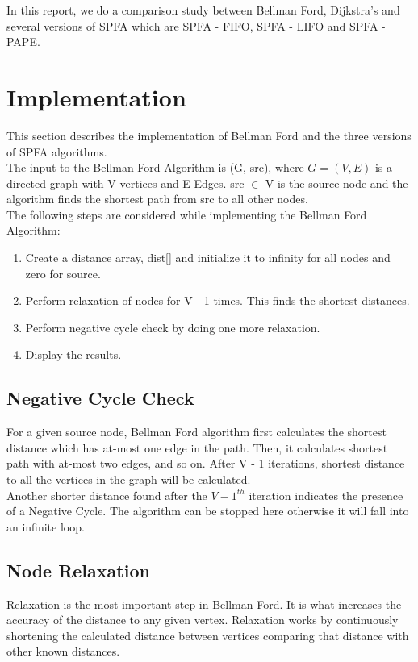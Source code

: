 \documentclass[12pt]{article}
\begin{document}
In this report, we do a comparison study between Bellman Ford, Dijkstra's and several versions of SPFA which are SPFA - FIFO, SPFA - LIFO and SPFA - PAPE. \\

\section{Implementation}
\label{sec:impl}
This section describes the implementation of Bellman Ford and the three versions of SPFA algorithms. \\

The input to the Bellman Ford Algorithm is (G, src), where $G = (V, E)$ is a directed graph with V vertices and E Edges. src $\in$ V is the source node and the algorithm finds the shortest path from src to all other nodes. \\  

The following steps are considered while implementing the Bellman Ford Algorithm:
\begin{enumerate}
	\item Create a distance array, dist[] and initialize it to infinity for all nodes and zero for source. 
	
	\item Perform relaxation of nodes for V - 1 times. This finds the shortest distances. 
	
	\item Perform negative cycle check by doing one more relaxation. 
	
	\item Display the results.  
\end{enumerate}

\subsection{Negative Cycle Check}
For a given source node, Bellman Ford algorithm first calculates the shortest distance which has at-most one edge in the path. Then, it calculates shortest path with at-most two edges, and so on. After V - 1 iterations, shortest distance to all the vertices in the graph will be calculated. \\ 
Another shorter distance found after the $V - 1^{th}$ iteration indicates the presence of a Negative Cycle. The algorithm can be stopped here otherwise it will fall into an infinite loop. \\

\subsection{Node Relaxation}
Relaxation is the most important step in Bellman-Ford. It is what increases the accuracy of the distance to any given vertex. Relaxation works by continuously shortening the calculated distance between vertices comparing that distance with other known distances. \\
\end{document}
